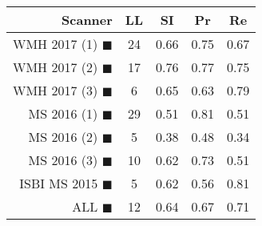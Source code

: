 \begin{tabular}{rcccc}
\toprule
Scanner & LL & SI & Pr & Re \\
\midrule
WMH 2017 (1) {\color[rgb]{ 1.00 0.00 0.00}$\blacksquare$} & 24 & 0.66 & 0.75 & 0.67 \\
WMH 2017 (2) {\color[rgb]{ 1.00 0.50 0.00}$\blacksquare$} & 17 & 0.76 & 0.77 & 0.75 \\
WMH 2017 (3) {\color[rgb]{ 1.00 0.80 0.00}$\blacksquare$} & 6 & 0.65 & 0.63 & 0.79 \\
MS  2016 (1) {\color[rgb]{ 0.20 0.80 0.00}$\blacksquare$} & 29 & 0.51 & 0.81 & 0.51 \\
MS  2016 (2) {\color[rgb]{ 0.00 0.40 1.00}$\blacksquare$} & 5 & 0.38 & 0.48 & 0.34 \\
MS  2016 (3) {\color[rgb]{ 0.60 0.00 1.00}$\blacksquare$} & 10 & 0.62 & 0.73 & 0.51 \\
ISBI MS 2015 {\color[rgb]{ 1.00 0.00 1.00}$\blacksquare$} & 5 & 0.62 & 0.56 & 0.81 \\
\midrule
ALL {\color[rgb]{ 1.00 1.00 1.00}$\blacksquare$} & 12 & 0.64 & 0.67 & 0.71 \\
\bottomrule
\end{tabular}